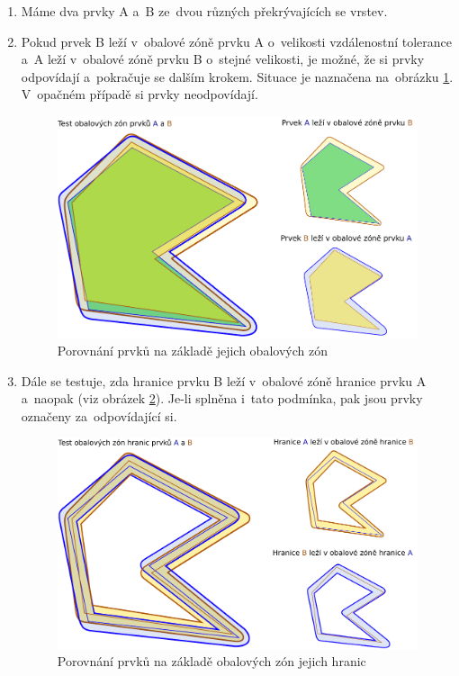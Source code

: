 \begin{enumerate}
 \item Máme dva prvky A a~B ze~dvou různých překrývajících se vrstev.
 \item Pokud prvek B leží v~obalové zóně prvku A o~velikosti vzdálenostní 
    tolerance a~A leží v~obalové zóně prvku B o~stejné velikosti, je možné, 
    že si prvky odpovídají a~pokračuje se dalším krokem. Situace je naznačena
    na~obrázku \ref{fig:buffer}. V~opačném případě si prvky neodpovídají.

\label{bfpic}
  \begin{figure}[hbt]
    \centering
      \includegraphics[width=300pt]{./pictures/buffer-test.pdf}
      \caption{Porovnání prvků na základě jejich obalových zón}
      \label{fig:buffer}

  \end{figure}
 \item Dále se testuje, zda hranice prvku B leží v~obalové zóně hranice prvku
    A a~naopak (viz obrázek \ref{fig:buffer-boundary}). Je-li splněna i~tato 
    podmínka, pak jsou prvky označeny za~odpovídající si.

\label{bf2pic}
  \begin{figure}[hbt]
    \centering
      \includegraphics[width=300pt]{./pictures/buffer-boundary.pdf}
      \caption{Porovnání prvků na základě obalových zón jejich hranic}
      \label{fig:buffer-boundary}
  \end{figure}

\end{enumerate}

